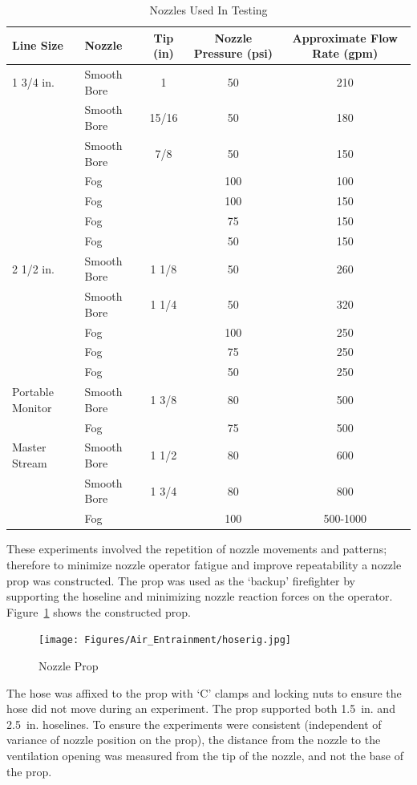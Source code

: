 \documentclass{article}
\begin{document}
\begin{table}[!ht]
\centering
\caption{Nozzles Used In Testing}\label{tab:Nozzle Selection}
\begin{tabular}{llccc}
\toprule[1.5pt]
Line Size & Nozzle & Tip (in)& Nozzle Pressure (psi) & Approximate Flow Rate (gpm) \\
\midrule
1 3/4 in. & Smooth Bore & 1 & 50 & 210 \\
 & Smooth Bore & 15/16 & 50 & 180 \\
 & Smooth Bore & 7/8 & 50 & 150 \\
 & Fog &  & 100 & 100 \\
 & Fog &  & 100 & 150 \\
 & Fog &  & 75 & 150 \\
 & Fog &  & 50 & 150 \\
 \midrule
2 1/2 in. & Smooth Bore & 1 1/8 & 50 & 260 \\
 & Smooth Bore & 1 1/4 & 50 & 320 \\
 & Fog &  & 100 & 250 \\
 & Fog &  & 75 & 250 \\
 & Fog &  & 50 & 250 \\ 
 \midrule
Portable Monitor & Smooth Bore & 1 3/8 & 80 & 500 \\
 & Fog &  & 75 & 500 \\ 
 \midrule
Master Stream & Smooth Bore & 1 1/2 & 80 & 600 \\
 & Smooth Bore & 1 3/4 & 80 & 800 \\
 & Fog &  & 100 & 500-1000 \\ 
 \bottomrule[1.25pt]
\end{tabular}
\end{table}

These experiments involved the repetition of nozzle movements and patterns; therefore to minimize nozzle operator fatigue and improve repeatability a nozzle prop was constructed. The prop was used as the `backup' firefighter by supporting the hoseline and minimizing nozzle reaction forces on the operator. Figure~\ref{fig:Nozzle_Prop} shows the constructed prop. 

\begin{figure}[!ht]
\centering
	\texttt{[image: Figures/Air\_Entrainment/hoserig.jpg]}
	\caption{Nozzle Prop}
	\label{fig:Nozzle_Prop}
\end{figure}

The hose was affixed to the prop with `C' clamps and locking nuts to ensure the hose did not move during an experiment. The prop supported both 1.5~in. and 2.5~in. hoselines. To ensure the experiments were consistent (independent of variance of nozzle position on the prop), the distance from the nozzle to the ventilation opening was measured from the tip of the nozzle, and not the base of the prop.
\end{document}
